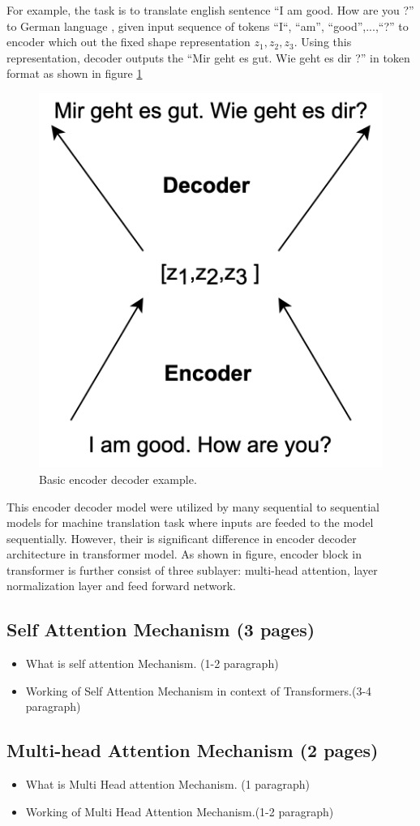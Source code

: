 \documentclass[%
	BCOR=8mm, %
	DIV=12, 
	toc=bibliography, %
	toc=listof, %
	oneside, %
	egregdoesnotlikesansseriftitles, %
	]{scrbook}
\begin{document}
For example, the task is to translate english sentence ``I am good. How are you ?'' to German language , given input sequence of tokens ``I``, ``am'', ``good'',...,``?'' to encoder which out the fixed shape representation $z_{1},z_{2},z_{3}$. Using this representation, decoder outputs the ``Mir geht es gut. Wie geht es dir ?'' in token format as shown in figure \ref{diag:EncoderDecoderExp}


\begin{figure}[h!]
\centering
\includegraphics[width=.30\textwidth]{img/EncoderDecoder2.png}
\caption[Encoder Decoder]{Basic encoder decoder example.}
\label{diag:EncoderDecoderExp}
\end{figure}

This encoder decoder model were utilized by many sequential to sequential models for machine translation task where inputs are feeded to the model sequentially. However, their is significant difference in 
encoder decoder architecture in transformer model.  As shown in figure, encoder block in transformer is further consist of three sublayer: multi-head attention, layer normalization layer and feed forward network.  


\subsection{Self Attention Mechanism (3 pages)}
\begin{itemize}
\item What is self attention Mechanism. (1-2 paragraph)
\item Working of Self Attention Mechanism in context of Transformers.(3-4 paragraph)
\end{itemize}

\subsection{Multi-head Attention Mechanism (2 pages)}
\begin{itemize}
\item What is Multi Head attention Mechanism. (1 paragraph)
\item Working of Multi Head Attention Mechanism.(1-2 paragraph)
\end{itemize}
\end{document}
